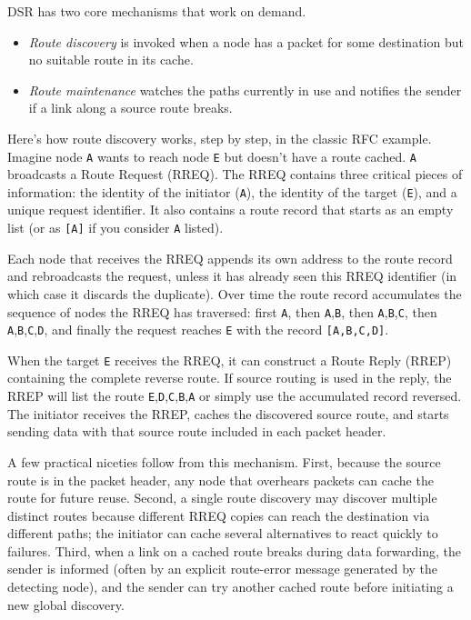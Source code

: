 DSR has two core mechanisms that work on demand. 
\begin{itemize}
    \item \textit{Route discovery} is invoked when a node has a packet for some destination but no suitable route in its cache. 
    \item \textit{Route maintenance} watches the paths currently in use and notifies the sender if a link along a source route breaks.
\end{itemize}
Here’s how route discovery works, step by step, in the classic RFC example. Imagine node \texttt{A} wants to reach node \texttt{E} but doesn’t have a route cached. \texttt{A} broadcasts a Route Request (RREQ). The RREQ contains three critical pieces of information: the identity of the initiator (\texttt{A}), the identity of the target (\texttt{E}), and a unique request identifier. It also contains a route record that starts as an empty list (or as \texttt{[A]} if you consider \texttt{A} listed).

Each node that receives the RREQ appends its own address to the route record and rebroadcasts the request, unless it has already seen this RREQ identifier (in which case it discards the duplicate). Over time the route record accumulates the sequence of nodes the RREQ has traversed: first \texttt{A}, then \texttt{A},\texttt{B}, then \texttt{A},\texttt{B},\texttt{C}, then \texttt{A},\texttt{B},\texttt{C},\texttt{D}, and finally the request reaches \texttt{E} with the record \texttt{[A,B,C,D]}.

When the target \texttt{E} receives the RREQ, it can construct a Route Reply (RREP) containing the complete reverse route. If source routing is used in the reply, the RREP will list the route \texttt{E},\texttt{D},\texttt{C},\texttt{B},\texttt{A} or simply use the accumulated record reversed. The initiator receives the RREP, caches the discovered source route, and starts sending data with that source route included in each packet header.

A few practical niceties follow from this mechanism. First, because the source route is in the packet header, any node that overhears packets can cache the route for future reuse. Second, a single route discovery may discover multiple distinct routes because different RREQ copies can reach the destination via different paths; the initiator can cache several alternatives to react quickly to failures. Third, when a link on a cached route breaks during data forwarding, the sender is informed (often by an explicit route-error message generated by the detecting node), and the sender can try another cached route before initiating a new global discovery.

